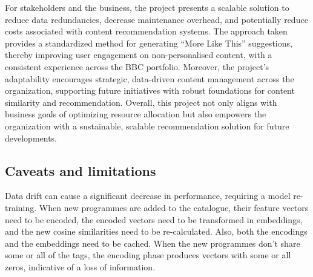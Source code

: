For stakeholders and the business, the project presents a scalable solution to reduce data redundancies,
decrease maintenance overhead, and potentially reduce costs associated with content recommendation systems.
The approach taken provides a standardized method for generating ``More Like This'' suggestions,
thereby improving user engagement on non-personalised content, with a consistent experience across the BBC portfolio.
Moreover, the project's adaptability encourages strategic, data-driven content management across the organization,
supporting future initiatives with robust foundations for content similarity and recommendation.
Overall, this project not only aligns with business goals of optimizing resource allocation but also empowers
the organization with a sustainable, scalable recommendation solution for future developments.

\subsection{Caveats and limitations}

Data drift can cause a significant decrease in performance, requiring a model re-training.
When new programmes are added to the catalogue,
their feature vectors need to be encoded, the encoded vectors need to be transformed in embeddings,
and the new cosine similarities need to be re-calculated.
Also, both the encodings and the embeddings need to be cached.
When the new programmes don't share some or all of the tags, the encoding phase
produces vectors with some or all zeros, indicative of a loss of information.

